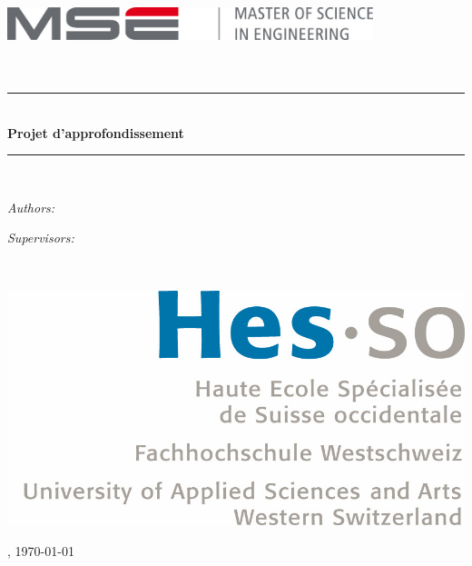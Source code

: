 \documentclass[a4paper,11pt]{report}
\newcommand{\Course}{Projet d'approfondissement}
\newcommand{\HRule}{\rule{\linewidth}{0.5mm}}
\begin{document}
\begin{titlepage}
    \begin{center}

        \includegraphics[width=0.8\textwidth]{img/mse_logo}~\\[1.5cm]
        \textsc{\Large \School}\\[0.25cm]
        \textsc{\Large \Faculty}\\[1.5cm]

        \HRule \\[0.4cm]
        { \huge \bfseries \Course \\[0.4cm] }
        \HRule \\[1.5cm]

        \begin{minipage}[t]{0.4\textwidth}
            \begin{flushleft} \Large
                \emph{Authors:}\\ \Authors
            \end{flushleft}
        \end{minipage}
        \begin{minipage}[t]{0.4\textwidth}
            \begin{flushright} \Large
                \emph{Supervisors:}\\\Supervisors
            \end{flushright}
        \end{minipage}~\\[1.5cm]

        \begin{center}
            \includegraphics[scale=0.7]{img/logo_hes-so}
        \end{center}

        \vfill

        {\large \Place, \today}

    \end{center}
\end{titlepage}
\end{document}
